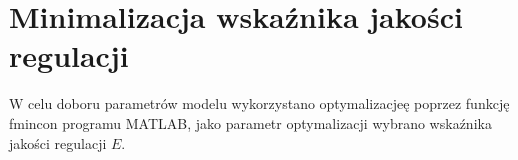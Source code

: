\section{Minimalizacja wskaźnika jakości regulacji}

W celu doboru parametrów modelu wykorzystano optymalizacjeę poprzez funkcję fmincon programu MATLAB, 
jako parametr optymalizacji wybrano wskaźnika jakości regulacji $E$.
